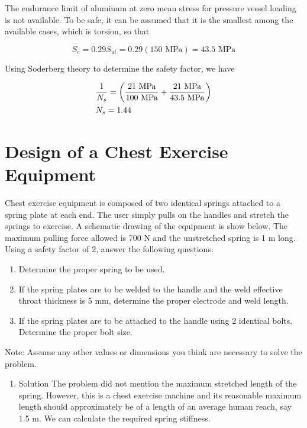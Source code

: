 \documentclass[a4paper,openany,12pt]{book}
\begin{document}
{{\begin{enumerate}
\begin{enumerate}
The endurance limit of aluminum at zero mean stress for pressure
vessel loading is not available. To be safe, it can be assumed that
it is the smallest among the available cases, which is torsion, so
that

$$S_e = 0.29S _{ut} = 0.29(150\text{ MPa}) = 43.5\text{ MPa}$$

Using Soderberg theory to determine the safety factor, we have

$$\begin{gathered}
         \frac{1}{N_s} = \left( \frac{21\text{ MPa}}{100\text{ MPa}} + \frac{21\text{ MPa}}{43.5\text{ MPa}} \right) \hfill \\
         N_s = 1.44 \hfill \\ 
       \end{gathered}$$
\end{enumerate}
\end{enumerate}

\section{Design of a Chest Exercise Equipment}
\label{design-of-a-chest-exercise-equipment}
Chest exercise equipment is composed of two identical springs attached
to a spring plate at each end. The user simply pulls on the handles and
stretch the springs to exercise. A schematic drawing of the equipment is
show below. The maximum pulling force allowed is 700 N and the
unstretched spring is 1 m long. Using a safety factor of 2, answer the
following questions.



\begin{enumerate}
\item Determine the proper spring to be used.

\item If the spring plates are to be welded to the handle and the weld
effective throat thickness is 5 mm, determine the proper electrode
and weld length.

\item If the spring plates are to be attached to the handle using 2
identical bolts. Determine the proper bolt size.
\end{enumerate}

Note: Assume any other values or dimensions you think are necessary to
solve the problem.

\begin{enumerate}
\item Solution
\label{solution-2}
The problem did not mention the maximum stretched length of the spring.
However, this is a chest exercise machine and its reasonable maximum
length should approximately be of a length of an average human reach,
say 1.5 m. We can calculate the required spring stiffness.


\end{enumerate}}}
\end{document}
